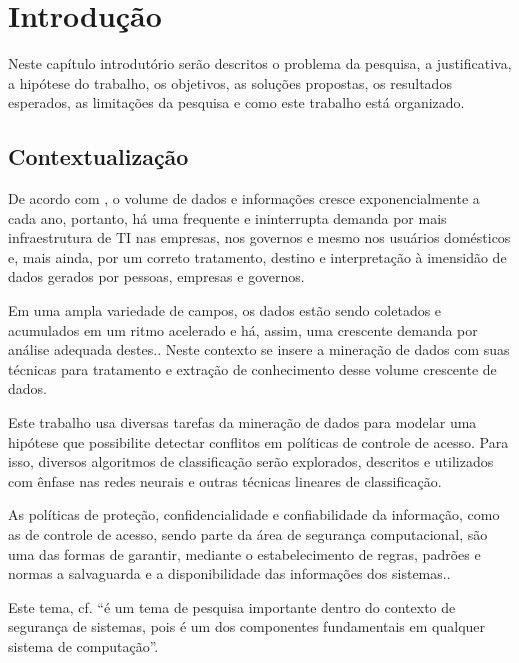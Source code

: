 \documentclass[
	12pt,				%
	openright,			%
	twoside,			%
	a4paper,			%
	english,			%
	french,				%
	spanish,			%
	brazil				%
	]{abntex2}
\begin{document}
\textual

\chapter{Introdução} \label{introducao}
Neste capítulo introdutório serão descritos o problema da pesquisa, a justificativa, a hipótese do trabalho, os objetivos, as soluções propostas, os resultados esperados, as limitações da pesquisa e como este trabalho está organizado.
\section{Contextualização} \label{contextualizacao}
De acordo com , o volume de dados e informações cresce exponencialmente a cada ano, portanto, há uma frequente e ininterrupta demanda por mais infraestrutura de TI nas empresas, nos governos e mesmo nos usuários domésticos e, mais ainda, por um correto tratamento, destino e interpretação à imensidão de dados gerados por pessoas, empresas e governos.\cite{machado2014} 

Em uma ampla variedade de campos, os dados estão sendo coletados e acumulados em um ritmo acelerado e há, assim, uma crescente demanda por análise adequada destes.\cite{fayyad1996, lima_fraud_2012}. Neste contexto se insere a mineração de dados com suas técnicas para tratamento e extração de conhecimento desse volume crescente de dados.\cite{Boscarioli2017, ferrari2017}

Este trabalho usa diversas tarefas da mineração de dados para modelar uma hipótese que possibilite detectar conflitos em políticas de controle de acesso. Para isso, diversos algoritmos de classificação serão explorados, descritos e utilizados com ênfase nas redes neurais e outras técnicas lineares de classificação. 

As políticas de proteção, confidencialidade e confiabilidade da informação, como as de controle de acesso, sendo parte da área de segurança computacional, são uma das formas de garantir, mediante o estabelecimento de regras, padrões e normas a salvaguarda e a disponibilidade das informações dos sistemas.\cite{sarkis2017}\cite{bui_efficient_2019}. 

Este tema, cf.  ``é um tema de pesquisa importante dentro do contexto de segurança de sistemas, pois é um dos componentes fundamentais em qualquer sistema de computação''.
\end{document}

